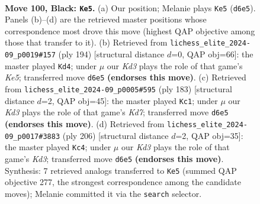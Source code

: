 \documentclass[11pt]{article}
\begin{document}
\clearpage

\begin{figure}[p]\centering
\begin{subfigure}{0.46\textwidth}\centering
\resizebox{\linewidth}{!}{%
\newchessgame
\chessboard[
  setfen={3R4/8/3k4/8/7r/r7/5K2/8 b - - 11 100},
  showmover=false,
  pgfstyle=straightmove, color=movearrow, markmove={d6-e5}
]}
\caption{}
\end{subfigure}\hfill
\begin{subfigure}{0.46\textwidth}\centering
\resizebox{\linewidth}{!}{%
\newchessgame
\chessboard[
  setfen={1R6/8/8/k3K1r1/8/8/2R5/8 w - - 15 98},
  showmover=false,
  pgfstyle=straightmove, color=movearrow, markmove={e5-d4}
]}
\caption{}
\end{subfigure}
\\[4pt]
\begin{subfigure}{0.46\textwidth}\centering
\resizebox{\linewidth}{!}{%
\newchessgame
\chessboard[
  setfen={8/8/1K6/3R4/8/8/3k4/r7 b - - 77 92},
  showmover=false,
  pgfstyle=straightmove, color=movearrow, markmove={d2-c1}
]}
\caption{}
\end{subfigure}\hfill
\begin{subfigure}{0.46\textwidth}\centering
\resizebox{\linewidth}{!}{%
\newchessgame
\chessboard[
  setfen={8/3k4/1R6/8/8/3K3r/8/8 w - - 66 104},
  showmover=false,
  pgfstyle=straightmove, color=movearrow, markmove={d3-c4}
]}
\caption{}
\end{subfigure}
\caption{\textbf{Move 100, Black: \texttt{Ke5}.} (a) Our position; Melanie plays \texttt{Ke5} (\texttt{d6e5}). Panels (b)--(d) are the retrieved master positions whose correspondence most drove this move (highest QAP objective among those that transfer to it). (b) Retrieved from \texttt{lichess\_elite\_2024-09\_p0019\#157} (ply 194) [structural distance $d$=0, QAP obj=66]: the master played \texttt{Kd4}; under $\mu$ our \emph{Kd3} plays the role of that game's \emph{Ke5}; transferred move \texttt{d6e5} \textbf{(endorses this move)}. (c) Retrieved from \texttt{lichess\_elite\_2024-09\_p0005\#595} (ply 183) [structural distance $d$=2, QAP obj=45]: the master played \texttt{Kc1}; under $\mu$ our \emph{Kd3} plays the role of that game's \emph{Kd7}; transferred move \texttt{d6e5} \textbf{(endorses this move)}. (d) Retrieved from \texttt{lichess\_elite\_2024-09\_p0017\#3883} (ply 206) [structural distance $d$=2, QAP obj=35]: the master played \texttt{Kc4}; under $\mu$ our \emph{Kd3} plays the role of that game's \emph{Kd3}; transferred move \texttt{d6e5} \textbf{(endorses this move)}. Synthesis: 7 retrieved analogs transferred to \texttt{Ke5} (summed QAP objective 277, the strongest correspondence among the candidate moves); Melanie committed it via the \texttt{search} selector.}
\label{fig:thought-m199}
\end{figure}
\end{document}
